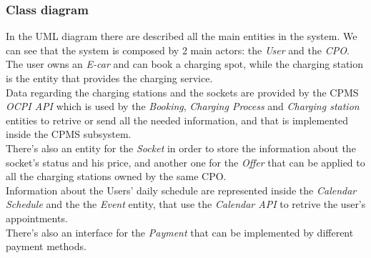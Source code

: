\documentclass[table, 12pt]{article} %
\begin{document}
        \subsubsection{Class diagram}
        \label{class_diagram}
            In the UML diagram there are described all the main entities in the system.
            We can see that the system is composed by 2 main actors: the \textit{User} and the \textit{CPO}.\\
            The user owns an \textit{E-car} and can book a charging spot, while the charging station is the entity that provides the charging service.\\
            Data regarding the charging stations and the sockets are provided by the CPMS \textit{OCPI API} which is used by the \textit{Booking}, \textit{Charging Process} and \textit{Charging station} entities to retrive or send all the needed information, and that is implemented inside the CPMS subsystem.\\
            There's also an entity for the \textit{Socket} in order to store the information about the socket's status and his price, and another one for the \textit{Offer} that can be applied to all the charging stations owned by the same CPO.\\
            Information about the Users' daily schedule are represented inside the \textit{Calendar Schedule} and the the \textit{Event} entity, that use the \textit{Calendar API} to retrive the user's appointments.\\
            There's also an interface for the \textit{Payment} that can be implemented by different payment methods.
            
\end{document}
